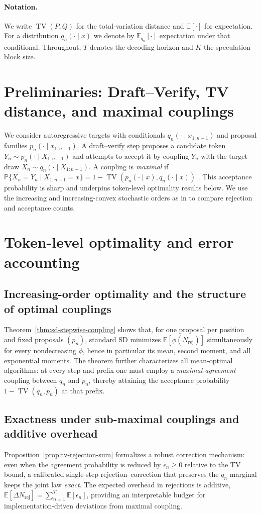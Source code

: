 \documentclass[twoside]{article}
\theoremstyle{plain}
\theoremstyle{definition}
\theoremstyle{remark}
\newcommand{\TV}{\operatorname{TV}}
\newcommand{\E}{\mathbb{E}}
\newcommand{\Prb}{\mathbb{P}}
\begin{document}
\paragraph{Notation.} We write $\TV(P,Q)$ for the total-variation distance and $\E[\cdot]$ for expectation. For a distribution $q_n(\cdot\mid x)$ we denote by $\E_{q_n}[\cdot]$ expectation under that conditional. Throughout, $T$ denotes the decoding horizon and $K$ the speculation block size.

\section{Preliminaries: Draft--Verify, TV distance, and maximal couplings}
We consider autoregressive targets with conditionals $q_n(\cdot\mid x_{1:n-1})$ and proposal families $p_n(\cdot\mid x_{1:n-1})$. A draft--verify step proposes a candidate token $Y_n\sim p_n(\cdot\mid X_{1:n-1})$ and attempts to accept it by coupling $Y_n$ with the target draw $X_n\sim q_n(\cdot\mid X_{1:n-1})$. A coupling is \emph{maximal} if $\Prb\{X_n=Y_n\mid X_{1:n-1}=x\}=1-\TV(p_n(\cdot\mid x),q_n(\cdot\mid x))$ \cite{Lindvall2002CouplingMethod}. This acceptance probability is sharp and underpins token-level optimality results below. We use the increasing and increasing-convex stochastic orders as in \cite{ShakedShanthikumar2007StochasticOrders} to compare rejection and acceptance counts.

\section{Token-level optimality and error accounting}
\label{sec:stepwise}
\subsection{Increasing-order optimality and the structure of optimal couplings}

Theorem~\ref{thm:sd-stepwise-coupling} shows that, for one proposal per position and fixed proposals $(p_n)$, standard SD minimizes $\E[\phi(N_{\mathrm{rej}})]$ simultaneously for every nondecreasing $\phi$, hence in particular its mean, second moment, and all exponential moments. The theorem further characterizes all mean-optimal algorithms: at every step and prefix one must employ a \emph{maximal-agreement} coupling between $q_n$ and $p_n$, thereby attaining the acceptance probability $1-\TV(q_n,p_n)$ at that prefix.

\subsection{Exactness under sub-maximal couplings and additive overhead}

Proposition~\ref{prop:tv-rejection-sum} formalizes a robust correction mechanism: even when the agreement probability is reduced by $\epsilon_n\ge 0$ relative to the TV bound, a calibrated single-step rejection--correction that preserves the $q_n$ marginal keeps the joint law \emph{exact}. The expected overhead in rejections is additive, $\E[\Delta N_{\mathrm{rej}}]=\sum_{n=1}^T\E[\epsilon_n]$, providing an interpretable budget for implementation-driven deviations from maximal coupling.
\end{document}
